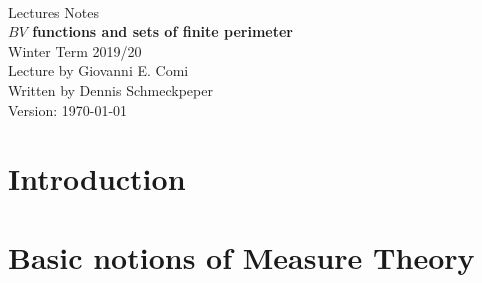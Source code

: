 \documentclass[ngerman]{report}
\begin{document}
\begin{titlepage}
  \centering\text{}\\[14ex]
  \Huge Lectures Notes\\[2ex]
  \Huge {\bf $BV$ functions and sets of finite perimeter}\\[18ex]
  \LARGE Winter Term 2019/20\\[22ex]
  Lecture by Giovanni E. Comi\\[2ex]
  Written by Dennis Schmeckpeper\\[8ex]
  \Large Version: \today\\
\end{titlepage}
\tableofcontents
\chapter*{Introduction}

\chapter{Basic notions of Measure Theory}


\cleardoublepage 


\end{document}
